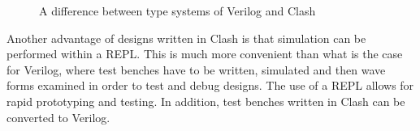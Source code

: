 
\begin{figure}
  \begin{minipage}{0.5\textwidth}
    
  \end{minipage}
  \begin{minipage}{0.5\textwidth}
    
  \end{minipage}
  \caption{A difference between type systems of Verilog and Clash}
  \label{code:type-strength}
\end{figure}


Another advantage of designs written in Clash is that simulation can
be performed within a \gls{REPL}.
This is much more convenient than what is the case for Verilog, where
test benches have to be written, simulated and then wave forms
examined in order to test and debug designs.
The use of a \gls{REPL} allows for rapid prototyping and testing.
In addition, test benches written in Clash can be converted to Verilog.


